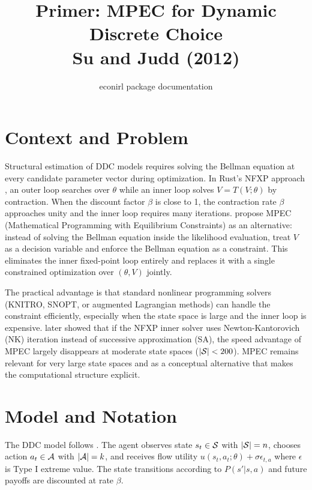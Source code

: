\documentclass[11pt]{article}
\title{Primer: MPEC for Dynamic Discrete Choice\\[3pt]
\large Su and Judd (2012)}
\author{econirl package documentation}
\date{}
\begin{document}
\maketitle
\vspace{-0.5em}

\section{Context and Problem}

Structural estimation of DDC models requires solving the Bellman equation at every candidate parameter vector during optimization.
In Rust's NFXP approach \citep{rust1987}, an outer loop searches over $\theta$ while an inner loop solves $V = T(V;\theta)$ by contraction.
When the discount factor $\beta$ is close to 1, the contraction rate $\beta$ approaches unity and the inner loop requires many iterations.
\citet{suJudd2012} propose MPEC (Mathematical Programming with Equilibrium Constraints) as an alternative: instead of solving the Bellman equation inside the likelihood evaluation, treat $V$ as a decision variable and enforce the Bellman equation as a constraint.
This eliminates the inner fixed-point loop entirely and replaces it with a single constrained optimization over $(\theta, V)$ jointly.

The practical advantage is that standard nonlinear programming solvers (KNITRO, SNOPT, or augmented Lagrangian methods) can handle the constraint efficiently, especially when the state space is large and the inner loop is expensive.
\citet{iskhakovRustSchjerning2016} later showed that if the NFXP inner solver uses Newton-Kantorovich (NK) iteration instead of successive approximation (SA), the speed advantage of MPEC largely disappears at moderate state spaces ($|\mathcal{S}| < 200$).
MPEC remains relevant for very large state spaces and as a conceptual alternative that makes the computational structure explicit.

\section{Model and Notation}

The DDC model follows \citet{rust1987}.
The agent observes state $s_t \in \mathcal{S}$ with $|\mathcal{S}| = n$, chooses action $a_t \in \mathcal{A}$ with $|\mathcal{A}| = k$, and receives flow utility $u(s_t, a_t; \theta) + \sigma \epsilon_{t,a}$ where $\epsilon$ is Type I extreme value.
The state transitions according to $P(s'|s,a)$ and future payoffs are discounted at rate $\beta$.
\end{document}
